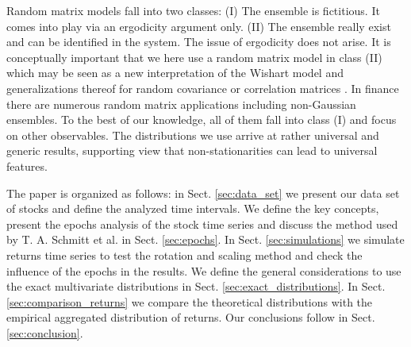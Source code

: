 Random matrix models \cite{random_matrix_1,random_matrix_2} fall into two
classes: (I) The ensemble is fictitious. It comes into play via an ergodicity
argument only. (II) The ensemble really exist and can be identified in the
system. The issue of ergodicity does not arise. It is conceptually important
that we here use a random matrix model in class (II) which may be seen as a new
interpretation of the Wishart model and generalizations thereof for random
covariance or correlation matrices \cite{wishart}. In finance there are
numerous random matrix applications
\cite{matrix_fin_01,matrix_fin_02,matrix_fin_03,matrix_fin_04,matrix_fin_05,matrix_fin_06,matrix_fin_07,matrix_fin_08,matrix_fin_09,matrix_fin_10,matrix_fin_11,matrix_fin_12,matrix_fin_13}
including non-Gaussian ensembles. To the best of our knowledge, all of them
fall into class (I) and focus on other observables. The distributions we use
arrive at rather universal and generic results, supporting view that
non-stationarities can lead to universal features.

The paper is organized as follows: in Sect. \ref{sec:data_set} we present our
data set of stocks and define the analyzed time intervals. We define the key
concepts, present the epochs analysis of the stock time series and discuss the
method used by T. A. Schmitt et al.
\cite{non_stationarity_fin_guhr} in Sect. \ref{sec:epochs}. In Sect.
\ref{sec:simulations} we simulate returns time series to test the rotation and
scaling method and check the influence of the epochs in the results. We define
the general considerations to use the exact multivariate distributions in Sect.
\ref{sec:exact_distributions}. In Sect. \ref{sec:comparison_returns} we compare
the theoretical distributions with the empirical aggregated distribution of
returns. Our conclusions follow in Sect. \ref{sec:conclusion}.